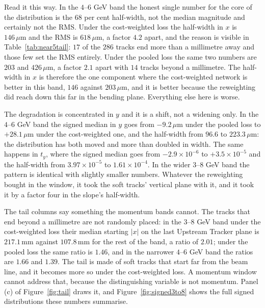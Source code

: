 \documentclass[11pt,a4paper]{article}
\newcommand{\um}{\ensuremath{\,\mu\mathrm{m}}}
\newcommand{\mm}{\ensuremath{\,\mathrm{mm}}}
\begin{document}
Read it this way. In the $4$--$6$ GeV band the honest single number for the core
of the distribution is the $68$ per cent half-width, not the median magnitude
and certainly not the RMS. Under the cost-weighted loss the half-width in $x$ is
$146\um$ and the RMS is $618\um$, a factor $4.2$ apart, and the reason is
visible in Table~\ref{tab:near5tail}: $17$ of the $286$ tracks end more than a
millimetre away and those few set the RMS entirely. Under the pooled loss the
same two numbers are $203$ and $426\um$, a factor $2.1$ apart with $14$ tracks
beyond a millimetre. The half-width in $x$ is therefore the one component where
the cost-weighted network is better in this band, $146$ against $203\um$, and
it is better because the reweighting did reach down this far in the bending
plane. Everything else here is worse.

The degradation is concentrated in $y$ and it is a shift, not a widening only.
In the $4$--$6$ GeV band the signed median in $y$ goes from $-9.2\um$ under the
pooled loss to $+28.1\um$ under the cost-weighted one, and the half-width from
$96.6$ to $223.3\um$: the distribution has both moved and more than doubled in
width. The same happens in $t_y$, where the signed median goes from
$-2.9\times10^{-6}$ to $+3.5\times10^{-5}$ and the half-width from
$3.97\times10^{-5}$ to $1.61\times10^{-4}$. In the wider $3$--$8$ GeV band the
pattern is identical with slightly smaller numbers. Whatever the reweighting
bought in the window, it took the soft tracks' vertical plane with it, and it
took it by a factor four in the slope's half-width.

The tail columns say something the momentum bands cannot. The tracks that end
beyond a millimetre are not randomly placed: in the $3$--$8$ GeV band under the
cost-weighted loss their median starting $|x|$ on the last Upstream Tracker
plane is $217.1\mm$ against $107.8\mm$ for the rest of the band, a ratio of
$2.01$; under the pooled loss the same ratio is $1.46$, and in the narrower
$4$--$6$ GeV band the ratios are $1.66$ and $1.39$. The tail is made of soft
tracks that start far from the beam line, and it becomes more so under the
cost-weighted loss. A momentum window cannot address that, because the
distinguishing variable is not momentum. Panel (c) of Figure~\ref{fig:tail}
draws it, and Figure~\ref{fig:signed3to8} shows the full signed distributions
these numbers summarise.
\end{document}
